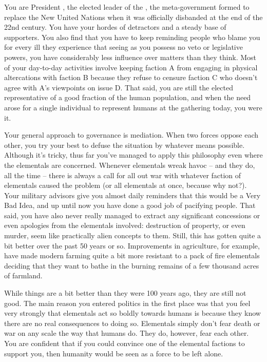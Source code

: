\documentclass[char]{elementals}
\begin{document}
\name{\cLeader{}}

You are President \cLeader{\intro}, the elected leader of the \cNewUN{\intro}, the meta-government formed to replace the New United Nations when it was officially disbanded at the end of the 22nd century. You have your hordes of detractors and a steady base of supporters. You also find that you have to keep reminding people who blame you for every ill they experience that seeing as you possess no veto or legislative powers, you have considerably less influence over matters than they think. Most of your day-to-day activities involve keeping faction A from engaging in physical altercations with faction B because they refuse to censure faction C who doesn't agree with A's viewpoints on issue D. That said, you are still the elected representative of a good fraction of the human population, and when the need arose for a single individual to represent humans at the gathering today, you were it.

Your general approach to governance is mediation. When two forces oppose each other, you try your best to defuse the situation by whatever means possible. Although it's tricky, thus far you've managed to apply this philosophy even where the elementals are concerned. Whenever elementals wreak havoc -- and they do, all the time -- there is always a call for all out war with whatever faction of elementals caused the problem (or all elementals at once, because why not?). Your military advisors give you almost daily reminders that this would be a Very Bad Idea, and up until now you have done a good job of pacifying people. That said, you have also never really managed to extract any significant concessions or even apologies from the elementals involved: destruction of property, or even murder, seem like practically alien concepts to them. Still, this has gotten quite a bit better over the past 50 years or so. Improvements in agriculture, for example, have made modern farming quite a bit more resistant to a pack of fire elementals deciding that they want to bathe in the burning remains of a few thousand acres of farmland.

While things are a bit better than they were 100 years ago, they are still not good. The main reason you entered politics in the first place was that you feel very strongly that elementals act so boldly towards humans is because they know there are no real consequences to doing so. Elementals simply don't fear death or war on any scale the way that humans do. They do, however, fear each other. You are confident that if you could convince one of the elemental factions to support you, then humanity would be seen as a force to be left alone.
\end{document}
